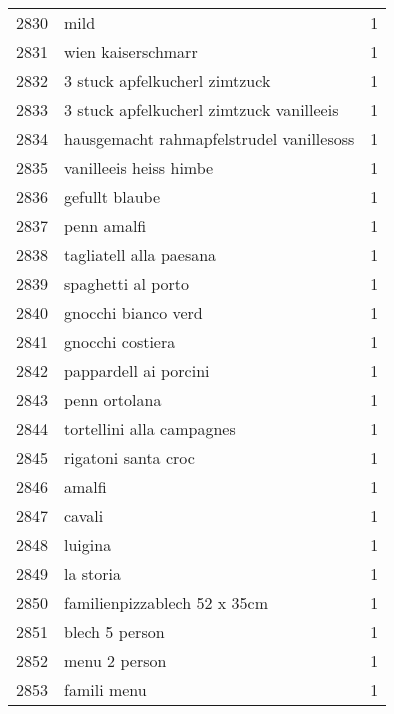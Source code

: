 \begin{tabular}{llr}
2830 &                                               mild &      1 \\
2831 &                                 wien kaiserschmarr &      1 \\
2832 &                      3 stuck apfelkucherl zimtzuck &      1 \\
2833 &           3 stuck apfelkucherl zimtzuck vanilleeis &      1 \\
2834 &           hausgemacht rahmapfelstrudel vanillesoss &      1 \\
2835 &                             vanilleeis heiss himbe &      1 \\
2836 &                                     gefullt blaube &      1 \\
2837 &                                        penn amalfi &      1 \\
2838 &                            tagliatell alla paesana &      1 \\
2839 &                                 spaghetti al porto &      1 \\
2840 &                                gnocchi bianco verd &      1 \\
2841 &                                   gnocchi costiera &      1 \\
2842 &                              pappardell ai porcini &      1 \\
2843 &                                      penn ortolana &      1 \\
2844 &                          tortellini alla campagnes &      1 \\
2845 &                                rigatoni santa croc &      1 \\
2846 &                                             amalfi &      1 \\
2847 &                                             cavali &      1 \\
2848 &                                            luigina &      1 \\
2849 &                                          la storia &      1 \\
2850 &                       familienpizzablech 52 x 35cm &      1 \\
2851 &                                     blech 5 person &      1 \\
2852 &                                      menu 2 person &      1 \\
2853 &                                        famili menu &      1 \\

\end{tabular}

